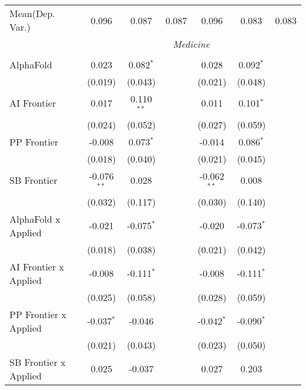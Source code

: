 \begin{tabular}{lcccccc}
Mean(Dep. Var.) & 0.096 & 0.087 & 0.087 & 0.096 & 0.083 & 0.083 \\
 & \multicolumn{6}{c}{\textit{Medicine}} \\ \\
   AlphaFold                      & 0.023         & 0.082$^{*}$  &                & 0.028         & 0.092$^{*}$  &   \\   
                                  & (0.019)       & (0.043)      &                & (0.021)       & (0.048)      &   \\   
   AI Frontier                    & 0.017         & 0.110$^{**}$ &                & 0.011         & 0.101$^{*}$  &   \\   
                                  & (0.024)       & (0.052)      &                & (0.027)       & (0.059)      &   \\   
   PP Frontier                    & -0.008        & 0.073$^{*}$  &                & -0.014        & 0.086$^{*}$  &   \\   
                                  & (0.018)       & (0.040)      &                & (0.021)       & (0.045)      &   \\   
   SB Frontier                    & -0.076$^{**}$ & 0.028        &                & -0.062$^{**}$ & 0.008        &   \\   
                                  & (0.032)       & (0.117)      &                & (0.030)       & (0.140)      &   \\   
   AlphaFold x Applied            & -0.021        & -0.075$^{*}$ &                & -0.020        & -0.073$^{*}$ &   \\   
                                  & (0.018)       & (0.038)      &                & (0.021)       & (0.042)      &   \\   
   AI Frontier x Applied          & -0.008        & -0.111$^{*}$ &                & -0.008        & -0.111$^{*}$ &   \\   
                                  & (0.025)       & (0.058)      &                & (0.028)       & (0.059)      &   \\   
   PP Frontier x Applied          & -0.037$^{*}$  & -0.046       &                & -0.042$^{*}$  & -0.090$^{*}$ &   \\   
                                  & (0.021)       & (0.043)      &                & (0.023)       & (0.050)      &   \\   
   SB Frontier x Applied          & 0.025         & -0.037       &                & 0.027         & 0.203        &   \\   

\end{tabular}
